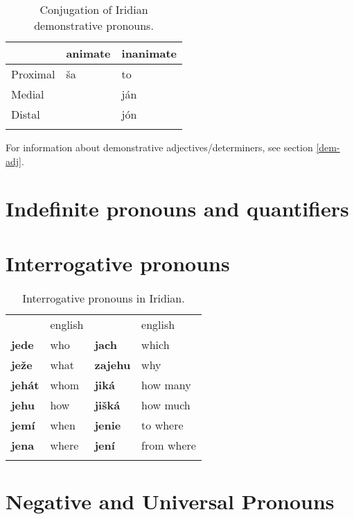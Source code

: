 \begin{table}[h!]
	\small\centering
	\caption{Conjugation of Iridian demonstrative pronouns.}
	\begin{tabu}to 0.7\textwidth{YMM}
		\toprule
						& {\sc animate}		& {\sc inanimate}\\
		\midrule
		Proximal		& \v{s}a			& to\\ \addlinespace
		Medial			&&j\'an\\ \addlinespace
		Distal			&&j\'on\\ \addlinespace
		\bottomrule
	\end{tabu}
\end{table}

For information about demonstrative adjectives/determiners, see section \ref{dem-adj}.

\section{Indefinite pronouns and quantifiers}


\section{Interrogative pronouns}

\begin{table}[h!]
	\small\centering
	\caption{Interrogative pronouns in Iridian.}
	\begin{tabu} to 0.8\textwidth{>{\bfseries}YY>{\bfseries}YY}
		\toprule\addlinespace
		&{\sc english}&&{\sc english}\\ \addlinespace
		\midrule\addlinespace
		jede 		& who &jach &which\\ \addlinespace
		je\v{z}e 	& what 		& zajehu 	&why\\ \addlinespace
		jeh\'at 	& whom		& jik\'a 	&how many\\ \addlinespace
		jehu 		& how		&ji\v{s}k\'a&how much\\ \addlinespace
		jem\'i 		& when 		& jenie 	&to where\\ \addlinespace
		jena 		& where 	& jen\'i 	&from where\\ \addlinespace
		\bottomrule
	\end{tabu}
\end{table}

\section{Negative and Universal Pronouns}

